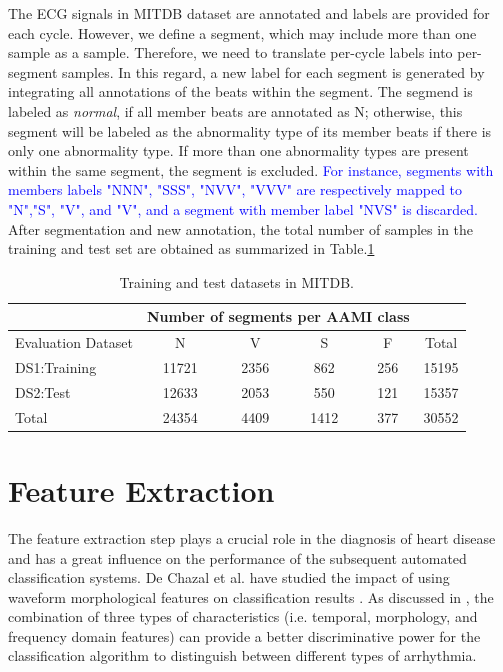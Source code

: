 The ECG signals in MITDB dataset are annotated and labels are provided for each cycle. However, we define a segment, which may include more than one sample as a sample. Therefore, we need to translate per-cycle labels into per-segment samples. In this regard, a new label for each segment is generated by integrating all annotations of the beats within the segment. The segmend is labeled as \textit{normal}, if all member beats are annotated as N; otherwise, this segment will be labeled as the abnormality type of its member beats if there is only one abnormality type. If more than one abnormality types are present within the same segment, the segment is excluded. \textcolor{blue}{For instance, segments with members labels "NNN", "SSS", "NVV", "VVV" are respectively mapped to "N","S", "V", and "V", and a segment with member label "NVS" is discarded.} 
After segmentation and new annotation, the total number of samples in the training and test set are obtained as summarized in Table.\ref{table:ds}
\begin{table}[b]
	\centering
	\caption{Training and test datasets in MITDB.}
	\vspace{-0.05in}
	\begin{tabular}{|l||c|c|c|c|c|}
		\hline 
		& \multicolumn{4}{c}{Number of segments per AAMI class} &\\ 
		\hline 
		Evaluation Dataset& N & V & S & F &Total \\ 
		\hline 
		DS1:Training & 11721& 2356 & 862 & 256 & 15195\\ 
		\hline 
		DS2:Test & 12633 & 2053 & 550 & 121 & 15357 \\ 
		\hline 
		Total & 24354 & 4409 & 1412 & 377 & 30552 \\ 
		\hline 
	\end{tabular}
	\label{table:ds} 
	\vspace{-0.15in}
\end{table}

\section{Feature Extraction}

The feature extraction step plays a crucial role in the diagnosis of heart disease and has a great influence on the performance of the subsequent automated classification systems. De Chazal et al. have studied the impact of using waveform morphological features on classification results \cite{autofs}. As discussed in \cite{jambukia2015classification}, the combination of three types of characteristics (i.e. temporal, morphology, and frequency domain features) can provide a better discriminative power for the classification algorithm to distinguish between different types of arrhythmia. 

